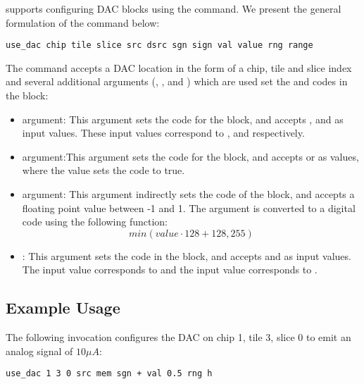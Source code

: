 \grendel supports configuring DAC blocks using the  command. We
present the general formulation of the  command below:

\begin{lstlisting}
use_dac chip tile slice src dsrc sgn sign val value rng range
\end{lstlisting}

The  command accepts a DAC location in the form of a chip, tile and slice
index and several additional arguments (, ,
 and ) which are used set the \static and \dynamic codes in the block:
\begin{itemize}
\item{} argument: This argument sets the  \static code for
  the block, and accepts ,  and  as input values.
  These input values correspond to ,  and  respectively.

\item{} argument:This argument sets the  \static code for the
  block, and accepts \tx{+} or \tx{-} as values, where the \tx{-} value sets the
   code to true.

\item{} argument: This argument indirectly sets the 
  \dynamic code of the block, and accepts a floating point value between -1 and
  1. The  argument is converted to a digital code using the following function:
\[
  min(value \cdot 128 + 128,255)
\]
\item{}: This argument sets the  \static code in the block,
and accepts  and  as input values. The  input value
corresponds to  and the  input value corresponds to
.

\end{itemize}

\subsection{Example Usage}

The following invocation configures the DAC on chip 1, tile 3, slice 0 to emit
an analog signal of $10 \mu A$:

\begin{lstlisting}
use_dac 1 3 0 src mem sgn + val 0.5 rng h
\end{lstlisting}


